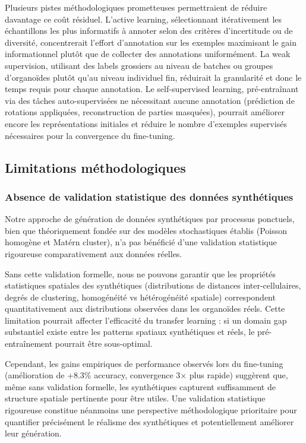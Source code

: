 Plusieurs pistes méthodologiques prometteuses permettraient de réduire davantage ce coût résiduel. L'active learning, sélectionnant itérativement les échantillons les plus informatifs à annoter selon des critères d'incertitude ou de diversité, concentrerait l'effort d'annotation sur les exemples maximisant le gain informationnel plutôt que de collecter des annotations uniformément. La weak supervision, utilisant des labels grossiers au niveau de batches ou groupes d'organoïdes plutôt qu'au niveau individuel fin, réduirait la granularité et donc le temps requis pour chaque annotation. Le self-supervised learning, pré-entraînant via des tâches auto-supervisées ne nécessitant aucune annotation (prédiction de rotations appliquées, reconstruction de parties masquées), pourrait améliorer encore les représentations initiales et réduire le nombre d'exemples supervisés nécessaires pour la convergence du fine-tuning.

\subsection{Limitations méthodologiques}

\subsubsection{Absence de validation statistique des données synthétiques}

Notre approche de génération de données synthétiques par processus ponctuels, bien que théoriquement fondée sur des modèles stochastiques établis (Poisson homogène et Matérn cluster), n'a pas bénéficié d'une validation statistique rigoureuse comparativement aux données réelles. 

Sans cette validation formelle, nous ne pouvons garantir que les propriétés statistiques spatiales des synthétiques (distributions de distances inter-cellulaires, degrés de clustering, homogénéité vs hétérogénéité spatiale) correspondent quantitativement aux distributions observées dans les organoïdes réels. Cette limitation pourrait affecter l'efficacité du transfer learning : si un domain gap substantiel existe entre les patterns spatiaux synthétiques et réels, le pré-entraînement pourrait être sous-optimal.

Cependant, les gains empiriques de performance observés lors du fine-tuning (amélioration de +8.3\% accuracy, convergence 3× plus rapide) suggèrent que, même sans validation formelle, les synthétiques capturent suffisamment de structure spatiale pertinente pour être utiles. Une validation statistique rigoureuse constitue néanmoins une perspective méthodologique prioritaire pour quantifier précisément le réalisme des synthétiques et potentiellement améliorer leur génération.

